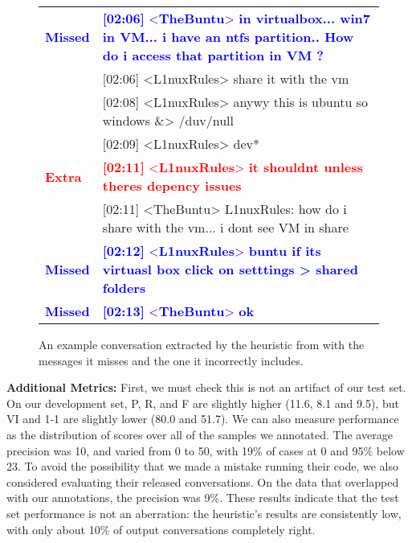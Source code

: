 \documentclass[11pt,a4paper]{article}
\newcommand{\tightparagraph}[1]{\noindent\textbf{#1:}}
\begin{document}
\begin{figure}
\centering
  \scriptsize
  \tt

  \setlength{\tabcolsep}{2pt}
  \begin{tabular}{l p{6.5cm}}
    \textcolor{blue}{\bf Missed} & \textcolor{blue}{\textbf{[02:06]} <\textbf{TheBuntu}> \textbf{in virtualbox... win7 in VM... i have an ntfs partition.. How do i access that partition in VM ?}} \\[2pt]
           & [02:06] <L1nuxRules> share it with the vm \\[2pt]
           & [02:08] <L1nuxRules> anywy this is ubuntu so windows \&> /duv/null \\[2pt]
           & [02:09] <L1nuxRules> dev* \\[2pt]
    \textcolor{red}{\bf Extra}  & \textcolor{red}{\textbf{[02:11]} <\textbf{L1nuxRules}> \textbf{it shouldnt unless theres depency issues}} \\[2pt]
           & [02:11] <TheBuntu> L1nuxRules: how do i share with the vm... i dont see VM in share \\[2pt]
    \textcolor{blue}{\bf Missed} & \textcolor{blue}{\textbf{[02:12]} <\textbf{L1nuxRules}> \textbf{buntu if its virtuasl box click on setttings > shared folders}} \\[2pt]
    \textcolor{blue}{\bf Missed} & \textcolor{blue}{\textbf{[02:13]} <\textbf{TheBuntu}> \textbf{ok}} \\
  \end{tabular}

  \caption{\label{fig:error}
  An example conversation extracted by the heuristic from \citet{Lowe:2015,Lowe:2017:DD} with the messages it misses and the one it incorrectly includes.
  }
\end{figure}
 
\tightparagraph{Additional Metrics}
First, we must check this is not an artifact of our test set.
On our development set, P, R, and F are slightly higher (11.6, 8.1 and 9.5), but VI and 1-1 are slightly lower (80.0 and 51.7).
We can also measure performance as the distribution of scores over all of the samples we annotated.
The average precision was 10, and varied from 0 to 50, with 19\% of cases at 0 and 95\% below 23.
To avoid the possibility that we made a mistake running their code, we also considered evaluating their released conversations.
On the data that overlapped with our annotations, the precision was 9\%.
These results indicate that the test set performance is not an aberration: the heuristic's results are consistently low, with only about 10\% of output conversations completely right.
\end{document}
